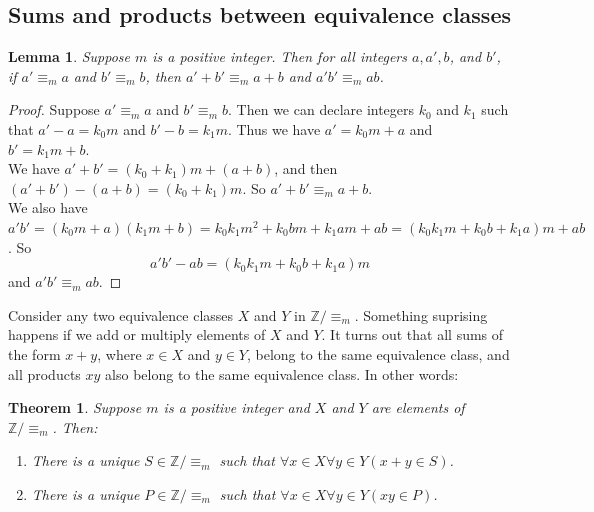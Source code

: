 \documentclass{report}
\newtheorem*{theorem}{Theorem}
\newtheorem*{lemma}{Lemma}
\theoremstyle{definition}
\begin{document}
\subsection{Sums and products between equivalence classes}
\begin{lemma}
Suppose $m$ is a positive integer. Then for all integers $a,a',b$, and $b'$, if $a'\equiv_ma$ and 
$b'\equiv_mb$, then $a'+b'\equiv_ma+b$ and $a'b'\equiv_mab$.
\end{lemma}
\begin{proof}
Suppose $a'\equiv_ma$ and $b'\equiv_mb$. Then we can declare integers $k_0$ and $k_1$ such that $a'-a=k_0m$ and $b'-b=k_1m$.
Thus we have $a'=k_0m+a$ and $b'=k_1m+b$.\\
\indent We have $a'+b'=(k_0+k_1)m+(a+b)$, and then $(a'+b')-(a+b)=(k_0+k_1)m$. So $a'+b'\equiv_ma+b$.\\
\indent We also have $a'b'=(k_0m+a)(k_1m+b)=k_0k_1m^2+k_0bm+k_1am+ab=(k_0k_1m+k_0b+k_1a)m+ab$. So
\begin{equation*}
a'b'-ab=(k_0k_1m+k_0b+k_1a)m
\end{equation*}
and $a'b'\equiv_mab$.
\end{proof}
\noindent Consider any two equivalence classes $X$ and $Y$ in $\mathbb Z/\equiv_m$. Something suprising happens if we add or multiply elements of $X$ and $Y$. It turns out
that all sums of the form $x+y$, where $x\in X$ and $y\in Y$, belong to the same equivalence class, and all products $xy$ also belong to the same equivalence class. In other words:
\begin{theorem}
Suppose $m$ is a positive integer and $X$ and $Y$ are elements of $\mathbb Z/\equiv_m$. Then:
\begin{enumerate}
\item There is a unique $S\in\mathbb Z/\equiv_m$ such that $\forall x\in X\forall y\in Y(x+y\in S)$.
\item There is a unique $P\in\mathbb Z/\equiv_m$ such that $\forall x\in X\forall y\in Y(xy\in P)$.
\end{enumerate}
\end{theorem}
\end{document}
